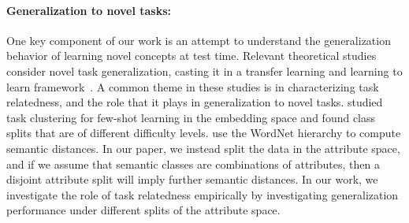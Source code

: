 
\savespacebeforesection
\paragraph{Generalization to novel tasks:}
One key component of our work is an attempt to understand the generalization
behavior of learning novel concepts at test time. Relevant theoretical studies
consider novel task generalization, casting it in a transfer learning and
learning to learn
framework~\citep{baxter2000model,ben2008notion,ben2010theory,pentina2014,amit2018meta,lucas2020lb}.
A common theme in these studies is in characterizing task relatedness, and the
role that it plays in generalization to novel tasks.
\citet{arnold2021embedding} studied task clustering for few-shot learning in
the embedding space and found class splits that are of different difficulty
levels. \citet{sariyildiz2021} use the WordNet hierarchy to compute semantic
distances. In our paper, we instead split the data in the attribute space, and
if we assume that semantic classes are combinations of attributes, then a
disjoint attribute split will imply further semantic distances.  In our work,
we investigate the role of task relatedness empirically by investigating
generalization performance under different splits of the attribute space.
